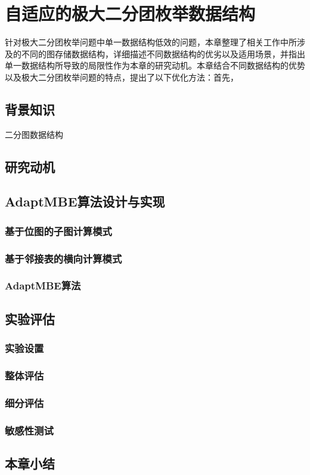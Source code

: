 \chapter{自适应的极大二分团枚举数据结构}
\label{ch:adapt_mbe}

针对极大二分团枚举问题中单一数据结构低效的问题，本章整理了相关工作中所涉及的不同的图存储数据结构，详细描述不同数据结构的优劣以及适用场景，并指出单一数据结构所导致的局限性作为本章的研究动机。本章结合不同数据结构的优势以及极大二分团枚举问题的特点，提出了以下优化方法：首先，






\section{背景知识}
二分图数据结构

\section{研究动机}

\section{AdaptMBE算法设计与实现}

\subsection{基于位图的子图计算模式}

\subsection{基于邻接表的横向计算模式}

\subsection{AdaptMBE算法}

\section{实验评估}

\subsection{实验设置}

\subsection{整体评估}

\subsection{细分评估}

\subsection{敏感性测试}

\section{本章小结}